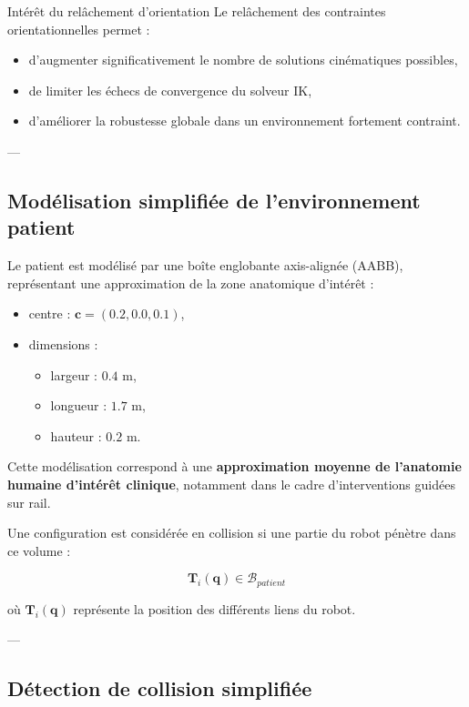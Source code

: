 \documentclass[11pt, a4paper]{article}
\begin{document}
\begin{techbox}{Intérêt du relâchement d’orientation}
Le relâchement des contraintes orientationnelles permet :
\begin{itemize}
  \item d’augmenter significativement le nombre de solutions cinématiques possibles,
  \item de limiter les échecs de convergence du solveur IK,
  \item d’améliorer la robustesse globale dans un environnement fortement contraint.
\end{itemize}
\end{techbox}

---

\subsection{Modélisation simplifiée de l’environnement patient}

Le patient est modélisé par une boîte englobante axis-alignée (AABB), représentant une approximation de la zone anatomique d’intérêt :

\begin{itemize}
  \item centre : $\mathbf{c} = (0.2, 0.0, 0.1)$,
  \item dimensions :
  \begin{itemize}
    \item largeur : $0.4$ m,
    \item longueur : $1.7$ m,
    \item hauteur : $0.2$ m.
  \end{itemize}
\end{itemize}

Cette modélisation correspond à une \textbf{approximation moyenne de l’anatomie humaine d’intérêt clinique}, notamment dans le cadre d’interventions guidées sur rail.

Une configuration est considérée en collision si une partie du robot pénètre dans ce volume :

\begin{equation}
\mathbf{T}_i(\mathbf{q}) \in \mathcal{B}_{patient}
\end{equation}

où $\mathbf{T}_i(\mathbf{q})$ représente la position des différents liens du robot.

---

\subsection{Détection de collision simplifiée}
\end{document}
